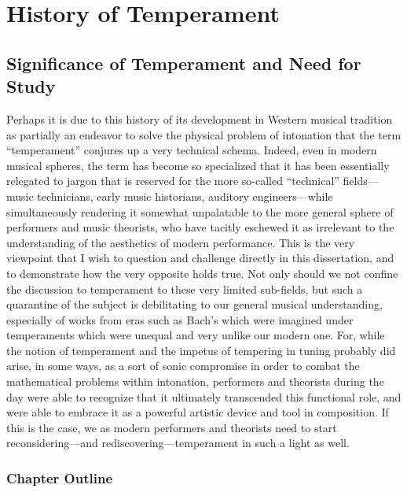     
    
    

    \hypertarget{History of Temperament}{\chapter{History of Temperament}\label{History of Temperament}}
    \section{Significance of Temperament and Need for
Study}\label{significance-of-temperament-and-need-for-study}

Perhaps it is due to this history of its development in Western musical
tradition as partially an endeavor to solve the physical problem of
intonation that the term ``temperament'' conjures up a very technical
schema. Indeed, even in modern musical spheres, the term has become so
specialized that it has been essentially relegated to jargon that is
reserved for the more so-called ``technical'' fields---music
technicians, early music historians, auditory engineers---while
simultaneously rendering it somewhat unpalatable to the more general
sphere of performers and music theorists, who have tacitly eschewed it
as irrelevant to the understanding of the aesthetics of modern
performance. This is the very viewpoint that I wish to question and
challenge directly in this dissertation, and to demonstrate how the very
opposite holds true. Not only should we not confine the discussion to
temperament to these very limited sub-fields, but such a quarantine of
the subject is debilitating to our general musical understanding,
especially of works from eras such as Bach's which were imagined under
temperaments which were unequal and very unlike our modern one. For,
while the notion of temperament and the impetus of tempering in tuning
probably did arise, in some ways, as a sort of sonic compromise in order
to combat the mathematical problems within intonation, performers and
theorists during the day were able to recognize that it ultimately
transcended this functional role, and were able to embrace it as a
powerful artistic device and tool in composition. If this is the case,
we as modern performers and theorists need to start reconsidering---and
rediscovering---temperament in such a light as well.

\subsection{Chapter Outline}\label{chapter-outline}

